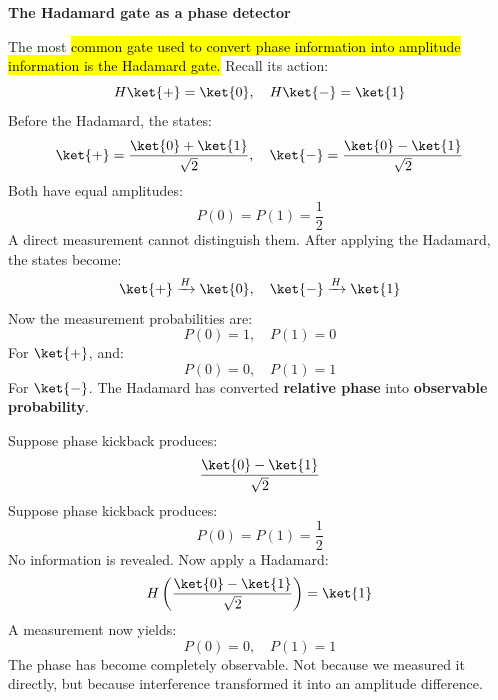 \highspace
\begin{flushleft}
    \textcolor{Green3}{ \textbf{The Hadamard gate as a phase detector}}
\end{flushleft}
The most \hl{common gate used to convert phase information into amplitude information is the Hadamard gate.} Recall its action:
\begin{equation*}
    H\ket{+} = \ket{0}, \quad H\ket{-} = \ket{1}
\end{equation*}
Before the Hadamard, the states:
\begin{equation*}
    \ket{+} = \frac{\ket{0} + \ket{1}}{\sqrt{2}}, \quad \ket{-} = \frac{\ket{0} - \ket{1}}{\sqrt{2}}
\end{equation*}
Both have equal amplitudes:
\begin{equation*}
    P(0) = P(1) = \frac{1}{2}
\end{equation*}
A direct measurement cannot distinguish them. After applying the Hadamard, the states become:
\begin{equation*}
    \ket{+} \xrightarrow{H} \ket{0}, \quad \ket{-} \xrightarrow{H} \ket{1}
\end{equation*}
Now the measurement probabilities are:
\begin{equation*}
    P(0) = 1, \quad P(1) = 0
\end{equation*}
For $\ket{+}$, and:
\begin{equation*}
    P(0) = 0, \quad P(1) = 1
\end{equation*}
For $\ket{-}$. The Hadamard has converted \textbf{relative phase} into \textbf{observable probability}.

\highspace
\begin{examplebox}
    Suppose phase kickback produces:
    \begin{equation*}
        \frac{\ket{0} - \ket{1}}{\sqrt{2}}
    \end{equation*}
    Suppose phase kickback produces:
    \begin{equation*}
        P(0) = P(1) = \frac{1}{2}
    \end{equation*}
    No information is revealed. Now apply a Hadamard:
    \begin{equation*}
        H\left(\frac{\ket{0} - \ket{1}}{\sqrt{2}}\right) = \ket{1}
    \end{equation*}
    A measurement now yields:
    \begin{equation*}
        P(0) = 0, \quad P(1) = 1
    \end{equation*}
    The phase has become completely observable. Not because we measured it directly, but because interference transformed it into an amplitude difference.
\end{examplebox}